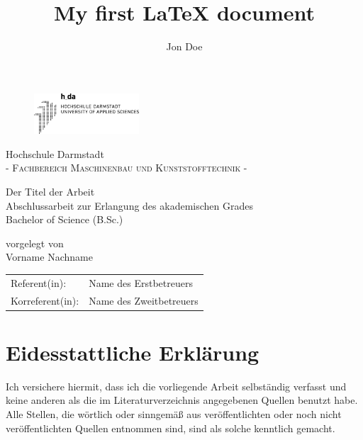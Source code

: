 \documentclass[a4paper,12pt]{article}
\title{My first \LaTeX{} document}
\author{Jon Doe}
\begin{document}
\newpage\null\thispagestyle{empty}\newpage
\newpage
\pagestyle{empty}

\begin{figure}[t]
	\centering
	\includegraphics[width=0.35\textwidth]{Bilder/Logo/logo-h-da.eps}
\end{figure}

\vfill

\begin{center}
\Large Hochschule Darmstadt \\
\normalsize \textsc{- Fachbereich Maschinenbau und Kunststofftechnik -} \\

\vfill

\Huge Der Titel der Arbeit \\
\normalsize
\vspace{12pt}
Abschlussarbeit zur Erlangung des akademischen Grades \\ 
Bachelor of Science (B.Sc.)

\vfill

vorgelegt von \\
Vorname Nachname

\vfill

\begin{tabular}[h]{p{4cm}l}
	Referent(in): & Name des Erstbetreuers\\
	Korreferent(in):  & Name des Zweitbetreuers \\
\end{tabular}

\end{center}

\newpage
\pagestyle{plain}
\section*{Eidesstattliche Erklärung}
Ich versichere hiermit, dass ich die vorliegende Arbeit selbständig verfasst und keine
anderen als die im Literaturverzeichnis angegebenen Quellen benutzt habe. \\

\noindent Alle Stellen, die wörtlich oder sinngemäß aus veröffentlichten oder noch nicht veröffentlichten Quellen entnommen sind, sind als solche kenntlich gemacht. \\
\end{document}
